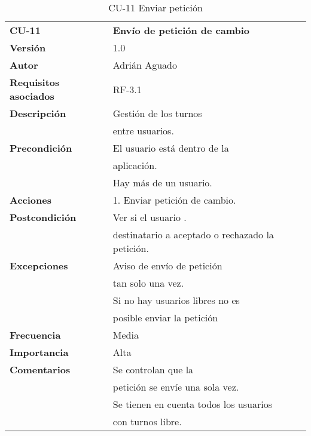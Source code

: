 \begin{table}[H]
\begin{tabular}{llr}  
\toprule
\begin{minipage}[b]{0.24\columnwidth}\raggedright\strut
\textbf{CU-11}\strut
\end{minipage} & \begin{minipage}[b]{0.72\columnwidth}\raggedright\strut
\textbf{Envío de petición de cambio}\strut
\end{minipage}\tabularnewline
\cmidrule(r){1-2}
\textbf{Versión}       & 1.0           \\
\textbf{Autor}       & Adrián  Aguado    \\
\textbf{Requisitos asociados}       & RF-3.1 \\
\textbf{Descripción} & Gestión de los turnos \\
& entre usuarios. \\
\textbf{Precondición}  & El usuario está dentro de la \\
& aplicación.      \\
& Hay más de un usuario. \\
\textbf{Acciones} & 1. Enviar petición de cambio. \\
\textbf{Postcondición} & Ver si el usuario . \\
 & destinatario a aceptado o rechazado la petición. \\
\textbf{Excepciones} &   Aviso de envío de petición  \\
 &  tan solo una vez. \\
 &  Si no hay usuarios libres no es  \\
  &  posible enviar la petición  \\
\textbf{Frecuencia} & Media          \\
\textbf{Importancia} & Alta            \\
\textbf{Comentarios } & Se controlan que la       \\
& petición se envíe una sola vez. \\
& Se tienen en cuenta todos los usuarios      \\
& con turnos libre. \\
\bottomrule
\end{tabular}
\caption{CU-11 Enviar petición} 
\end{table}

